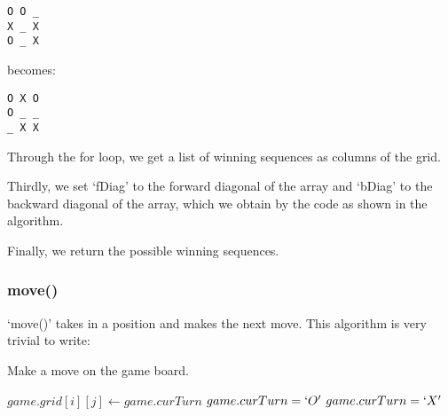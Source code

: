 \documentclass{article}
\begin{document}
\begin{verbatim}
O O _
X _ X
O _ X
\end{verbatim}

becomes:

\begin{verbatim}
O X O
O _ _
_ X X
\end{verbatim}

Through the for loop, we get a list of winning sequences as columns of the grid.

Thirdly, we set `fDiag' to the forward diagonal of the array and `bDiag' to the backward diagonal of the array, which we obtain by the code as shown in the algorithm.

Finally, we return the possible winning sequences.

\subsubsection{move()}

`move()' takes in a position and makes the next move. This algorithm is very trivial to write:

\begin{algorithm}
\caption{Make a move on the game board.}

\begin{algorithmic}[1]
\State $game.grid[i][j] \gets game.curTurn$
  \State $game.curTurn = `O'$
  \State $game.curTurn = `X'$
\EndIf
\EndProcedure
\end{algorithmic}
\end{algorithm}
\end{document}
